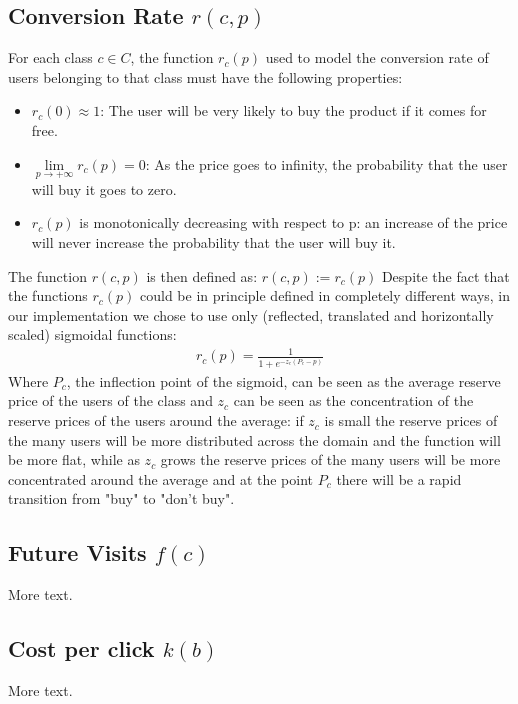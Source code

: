 \documentclass[11pt]{article} %
\begin{document}
\subsection{Conversion Rate $r(c,p)$}
For each class $c \in C$, the function $r_c(p)$ used to model the conversion rate of users belonging to that class must have the following properties:
\begin{itemize}
\item $r_c(0) \approx 1$: The user will be very likely to buy the product if it comes for free.
\item $\lim\limits_{p \to +\infty} r_c(p) = 0$: As the price goes to infinity, the probability that the user will buy it goes to zero.
\item $r_c(p)$ is monotonically decreasing with respect to p: an increase of the price will never increase the probability that the user will buy it.
\end{itemize}
The function $r(c,p)$ is then defined as: $r(c,p) := r_c(p)$
Despite the fact that the functions $r_c(p)$ could be in principle defined in completely different ways, in our implementation we chose to use only (reflected, translated and horizontally scaled) sigmoidal functions:
\begin{align*}
r_c(p) = \frac{1}{1+e^{-z_c(P_c-p)}}
\end{align*}
Where $P_c$, the inflection point of the sigmoid, can be seen as the average reserve price of the users of the class and $z_c$ can be seen as the concentration of the reserve prices of the users around the average: if $z_c$ is small the reserve prices of the many users will be more distributed across the domain and the function will be more flat, while as $z_c$ grows the reserve prices of the many users will be more concentrated around the average and at the point $P_c$ there will be a rapid transition from "buy" to "don't buy".
\subsection{Future Visits $f(c)$}

More text.

\subsection{Cost per click $k(b)$}

More text.
\end{document}

